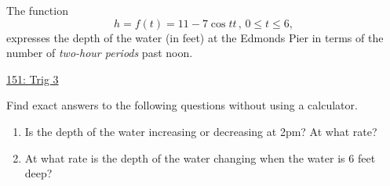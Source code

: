 \documentclass{ximera}
\begin{document}
\begin{question}  \label{Qghghgfdgdsfg0900}

The function
\[
       h = f(t) = 11 - 7 \cos t t \, , \, 0\leq t \leq 6 ,
\]
expresses the depth of the water (in feet) at the Edmonds Pier in terms of the number of \emph{two-hour periods} past noon.

\begin{onlineOnly}
    \begin{center}
\end{center}
\end{onlineOnly}

\href{https://www.desmos.com/calculator/4bh7kimi7f}{151: Trig 3}

Find exact answers to the following questions without using a calculator.


\begin{enumerate}
\item Is the depth of the water increasing or decreasing at 2pm? At what rate?

\item At what rate is the depth of the water changing when the water is $6$ feet deep? 

\end{enumerate}
\end{question}
\end{document}
